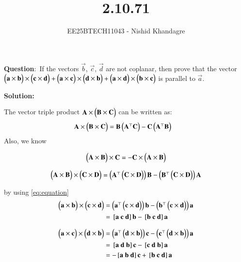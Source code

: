 \documentclass[journal]{IEEEtran}
\title{2.10.71}
\author{EE25BTECH11043 - Nishid Khandagre} %
\begin{document}
\maketitle

\renewcommand{\thefigure}{\theenumi}
\renewcommand{\thetable}{\theenumi}


\textbf{Question}:\
If the vectors $\vec{b}$, $\vec{c}$, $\vec{d}$ are not coplanar, then prove that the vector
$\begin{pmatrix}\mathbf{a} \times\mathbf{b}\end{pmatrix} \times\begin{pmatrix}\mathbf{c} \times\mathbf{d}\end{pmatrix} + \begin{pmatrix}\mathbf{a} \times\mathbf{c}\end{pmatrix} \times\begin{pmatrix}\mathbf{d} \times\mathbf{b}\end{pmatrix} + \begin{pmatrix}\mathbf{a} \times\mathbf{d}\end{pmatrix} \times\begin{pmatrix}\mathbf{b} \times\mathbf{c}\end{pmatrix}$
is parallel to $\vec{a}$.

\textbf{Solution: }

The vector triple product $\mathbf{A} \times \begin{pmatrix}\mathbf{B} \times \mathbf{C}\end{pmatrix}$ can be written as:
\begin{align}
\mathbf{A} \times \begin{pmatrix}\mathbf{B} \times \mathbf{C}\end{pmatrix} &= \mathbf{B}\begin{pmatrix}\mathbf{A}^\top \mathbf{C}\end{pmatrix} - \mathbf{C}\begin{pmatrix}\mathbf{A}^\top \mathbf{B}\end{pmatrix}
\end{align}
Also, we know

\begin{align}
\begin{pmatrix}\mathbf{A} \times \mathbf{B}\end{pmatrix} \times \mathbf{C} = - \mathbf{C} \times \begin{pmatrix}\mathbf{A} \times \mathbf{B}\end{pmatrix}
\end{align}


\begin{align}
\begin{pmatrix}\mathbf{A} \times \mathbf{B}\end{pmatrix} \times \begin{pmatrix}\mathbf{C} \times \mathbf{D}\end{pmatrix} = \begin{pmatrix}\mathbf{A}^\top \begin{pmatrix}\mathbf{C} \times \mathbf{D}\end{pmatrix}\end{pmatrix} \mathbf{B} - \begin{pmatrix}\mathbf{B}^\top \begin{pmatrix}\mathbf{C} \times \mathbf{D}\end{pmatrix}\end{pmatrix} \mathbf{A}
\label{eq:equation}
\end{align}


by using \eqref{eq:equation}
\begin{align}
\myvec{\vec{a} \times\vec{b}}\times \myvec{\vec{c} \times\vec{d}}&= \myvec{\vec{a}^\top \myvec{\vec{c} \times \vec{d}}} \vec{b} - \myvec{\vec{b}^\top \myvec{\vec{c} \times \vec{d}}} \vec{a}\\
&=\sbrak{\vec{a} \ \vec{c} \ \vec{d}}\vec{b} - \sbrak{\vec{b} \ \vec{c} \ \vec{d}}\vec{a}
\end{align}

\begin{align}
\myvec{\vec{a} \times\vec{c}} \times\myvec{\vec{d} \times\vec{b}}&=
\myvec{\vec{a}^\top \myvec{\vec{d} \times \vec{b}}} \vec{c} - \myvec{\vec{c}^\top \myvec{\vec{d} \times \vec{b}}} \vec{a}\\
&= \sbrak{\vec{a} \ \vec{d} \ \vec{b}}\vec{c} - \sbrak{\vec{c} \ \vec{d} \ \vec{b}}\vec{a} \\
&= -\sbrak{\vec{a} \ \vec{b} \ \vec{d}}\vec{c} + \sbrak{\vec{b} \ \vec{c} \ \vec{d}}\vec{a}
\end{align}
\end{document}
